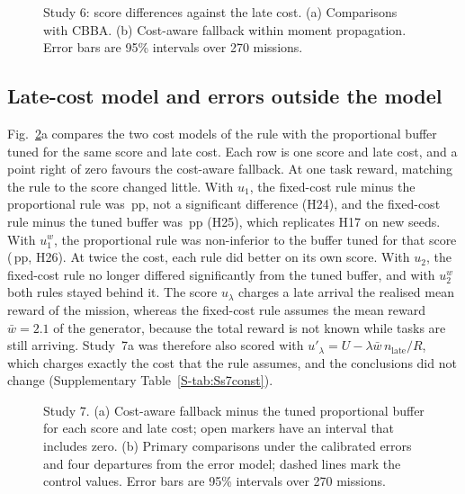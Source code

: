 \begin{figure}[t]
\centering
{}
\caption{Study 6: score differences against the late cost. (a) Comparisons with CBBA. (b) Cost-aware fallback within
moment propagation. Error bars are 95\% intervals over 270 missions.}\label{fig:s6}
\end{figure}

\subsection{Late-cost model and errors outside the model}\label{sec:study7}
Fig.~\ref{fig:s7}a compares the two cost models of the rule with the proportional buffer tuned for the same score and
late cost. Each row is one score and late cost, and a point right of zero favours the cost-aware fallback. At one task
reward, matching the rule to the score changed little. With $u_1$, the fixed-cost rule minus the proportional rule
was \,pp, not a significant difference (H24), and the fixed-cost rule minus the tuned buffer was
\,pp (H25),
which replicates H17 on new seeds. With $u^w_1$, the proportional rule was non-inferior to the buffer tuned for that score
(\,pp, H26). At twice the cost, each rule did better on its own score. With $u_2$, the fixed-cost
rule no longer differed significantly from the tuned buffer, and with $u^w_2$ both rules stayed behind it. The score
$u_\lambda$ charges a late arrival the realised mean reward of the mission, whereas the fixed-cost rule assumes the mean
reward $\bar w=2.1$ of the generator, because the total reward is not known while tasks are still arriving. Study~7a was
therefore also scored with $u'_\lambda=U-\lambda\bar w\,n_{\mathrm{late}}/R$, which charges exactly the cost that the
rule assumes, and the conclusions did not change (Supplementary Table~\ref{S-tab:Ss7const}).

\begin{figure}[t]
\centering
{}
\caption{Study 7. (a) Cost-aware fallback minus the tuned proportional buffer for each score and late cost; open
markers have an interval that includes zero. (b) Primary comparisons under the calibrated errors and four departures
from the error model; dashed lines mark the control values. Error bars are 95\% intervals over 270 missions.}\label{fig:s7}
\end{figure}

